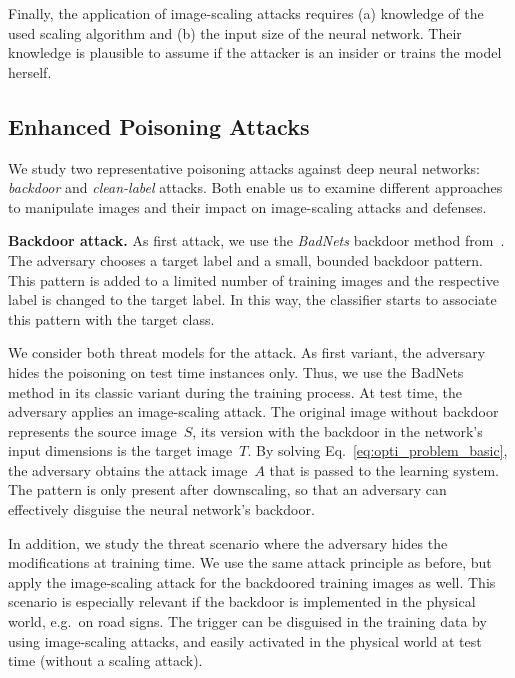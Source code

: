\documentclass[conference]{IEEEtran}
\renewcommand{\paragraph}[1]{{\vskip 8pt \noindent\bf #1 }}
\newcommand{\srcimg}{\ensuremath{S}\xspace}
\newcommand{\tarimg}{\ensuremath{T}\xspace}
\newcommand{\attimg}{\ensuremath{A}\xspace}
\begin{document}
\vspace{0.5em}
Finally, the application of image-scaling attacks
requires (a) knowledge of the used scaling algorithm and (b) the input 
size of the neural network. Their knowledge is plausible to assume if 
the attacker is an insider or trains the model herself.





\subsection{Enhanced Poisoning Attacks}
\label{subsec:poisoningwithimagescaling}
We study two representative poisoning attacks against deep neural 
networks: \emph{backdoor} and \emph{clean-label} attacks.
Both enable us to examine different approaches to manipulate images and 
their impact on image-scaling attacks and defenses. 


\paragraph{Backdoor attack.}
As first attack, we use the \emph{BadNets} backdoor method 
from~\citet{GuDolGar17}. The adversary chooses a target label and a 
small, bounded backdoor pattern. This pattern is added to a limited 
number of training images and the respective label is changed to the 
target label. In this way, the classifier starts to associate this 
pattern with the target class.

We consider both threat models for the attack. As first variant, the 
adversary hides the poisoning on test time instances only. Thus, 
we use the BadNets method in its classic variant during the training 
process.
At test time, the adversary applies an image-scaling attack. The 
original image without backdoor represents the source image~\srcimg, 
its version with the backdoor in the network's input dimensions is the 
target image~\tarimg. By solving Eq.~\eqref{eq:opti_problem_basic}, the 
adversary obtains the attack image~\attimg that is passed to the 
learning system.
The pattern is only present after downscaling, so that an adversary can 
effectively disguise the neural network's backdoor.

In addition, we study the threat scenario where the adversary hides the 
modifications at training time. We use the same 
attack principle as before, but apply the image-scaling attack for the 
backdoored training images as well. 
This scenario is especially relevant if the backdoor is implemented in 
the physical world, e.g.\ on road signs. The trigger can be disguised 
in the training data by using image-scaling attacks, and easily 
activated in the physical world at test time (without a scaling attack).
\end{document}
